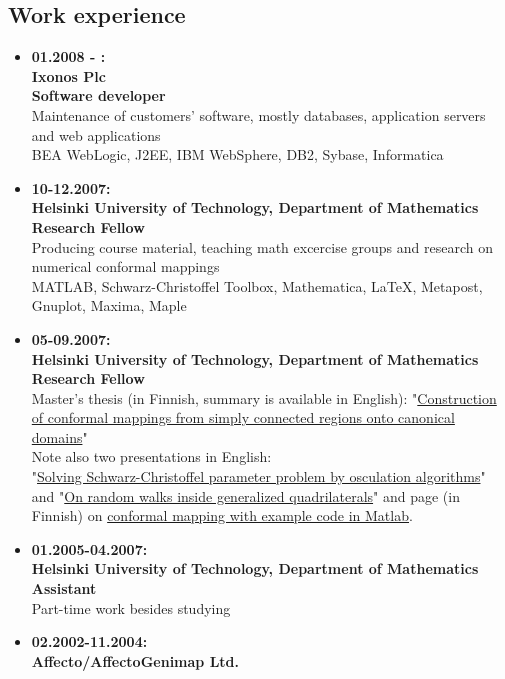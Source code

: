 \documentclass[a4paper,12pt]{article}
\begin{document}
\subsection*{Work experience}
\begin{itemize}
\item
{\bf 01.2008 - :\\
Ixonos Plc \\
Software developer} \\
Maintenance of customers' software, mostly databases, application servers and web applications \\
BEA WebLogic, J2EE, IBM WebSphere, DB2, Sybase, Informatica
\item
{\bf 10-12.2007:\\
Helsinki University of Technology, Department of Mathematics \\
Research Fellow} \\
Producing course material, teaching math excercise groups and
research on numerical conformal mappings \\
MATLAB, Schwarz-Christoffel Toolbox, Mathematica, LaTeX, Metapost, Gnuplot,
Maxima, Maple
\item
{\bf 05-09.2007:\\
Helsinki University of Technology, Department of Mathematics \\
Research Fellow} \\
Master's thesis (in Finnish, summary is available in English): "\href{http://math.tkk.fi/~mnummeli/tutkimus/diplomityo.pdf}
{Construction of conformal mappings from simply connected regions onto
canonical domains}" \\
Note also two presentations in English: \\
"\href{http://math.tkk.fi/~mnummeli/tutkimus/esitelma071015.pdf}{Solving Schwarz-Christoffel parameter problem by osculation algorithms}" and
"\href{http://math.tkk.fi/~mnummeli/tutkimus/esitelma071024.pdf}{On random
walks inside generalized quadrilaterals}" and page (in Finnish)
on \href{http://math.tkk.fi/~mnummeli/tutkimus/konformi.html}
{conformal mapping with example code in Matlab}.
\item
{\bf 01.2005-04.2007:\\
Helsinki University of Technology, Department of Mathematics \\
Assistant} \\
Part-time work besides studying
\item
{\bf 02.2002-11.2004:\\
Affecto/AffectoGenimap Ltd. \\
}
\end{itemize}
\end{document}
